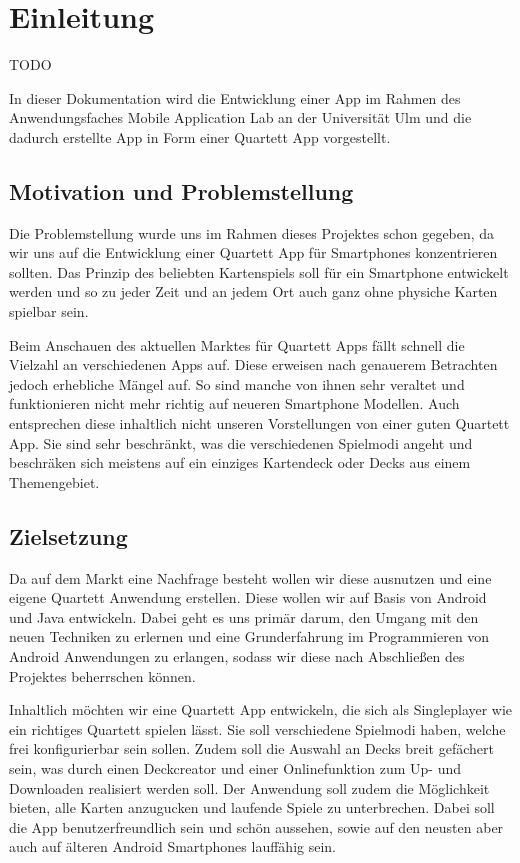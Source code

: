\chapter{Einleitung}
\label{cha:einleitung}

TODO

In dieser Dokumentation wird die Entwicklung einer App im Rahmen des Anwendungsfaches Mobile Application Lab an der Universität Ulm und die dadurch erstellte App in Form einer Quartett App vorgestellt.

\section{Motivation und Problemstellung}
\label{sec:einleitung:problemstellung}

Die Problemstellung wurde uns im Rahmen dieses Projektes schon gegeben, da wir uns auf die Entwicklung einer Quartett App für Smartphones konzentrieren sollten. Das Prinzip des beliebten Kartenspiels soll für ein Smartphone entwickelt werden und so zu jeder Zeit und an jedem Ort auch ganz ohne physiche Karten spielbar sein.

Beim Anschauen des aktuellen Marktes für Quartett Apps fällt schnell die Vielzahl an verschiedenen Apps auf. Diese erweisen nach genauerem Betrachten jedoch erhebliche Mängel auf. So sind manche von ihnen sehr veraltet und funktionieren nicht mehr richtig auf neueren Smartphone Modellen. Auch entsprechen diese inhaltlich nicht unseren Vorstellungen von einer guten Quartett App. Sie sind sehr beschränkt, was die verschiedenen Spielmodi angeht und beschräken sich meistens auf ein einziges Kartendeck oder Decks aus einem Themengebiet.

\section{Zielsetzung}
\label{sec:einleitung:zielsetzung}

Da auf dem Markt eine Nachfrage besteht wollen wir diese ausnutzen und eine eigene Quartett Anwendung erstellen. Diese wollen wir auf Basis von Android und Java entwickeln. Dabei geht es uns primär darum, den Umgang mit den neuen Techniken zu erlernen und eine Grunderfahrung im Programmieren von Android Anwendungen zu erlangen, sodass wir diese nach Abschließen des Projektes beherrschen können.

Inhaltlich möchten wir eine Quartett App entwickeln, die sich als Singleplayer wie ein richtiges Quartett spielen lässt. Sie soll verschiedene Spielmodi haben, welche frei konfigurierbar sein sollen. Zudem soll die Auswahl an Decks breit gefächert sein, was durch einen Deckcreator und einer Onlinefunktion zum Up- und Downloaden realisiert werden soll. Der Anwendung soll zudem die Möglichkeit bieten, alle Karten anzugucken und laufende Spiele zu unterbrechen. Dabei soll die App benutzerfreundlich sein und schön aussehen, sowie auf den neusten aber auch auf älteren Android Smartphones lauffähig sein.

